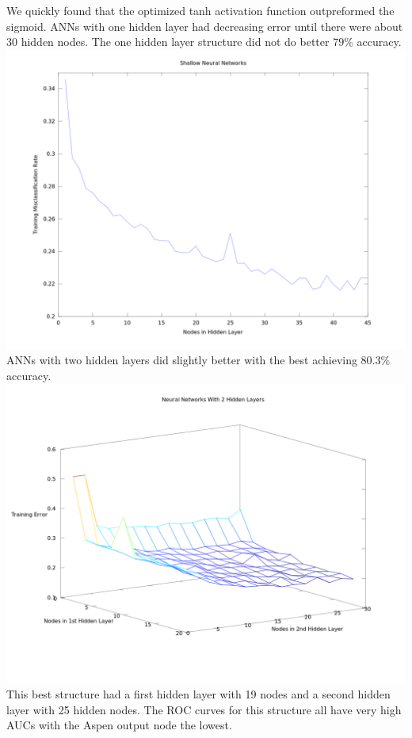 \documentclass[11pt]{article}
\begin{document}
We quickly found that the optimized tanh activation function outpreformed the sigmoid.  ANNs with one hidden layer had decreasing error until there were about 30 hidden nodes.  The one hidden layer structure did not do better $79\%$ accuracy. \\
\includegraphics[width=\linewidth]{images/shallow.png}
ANNs with two hidden layers did slightly better with the best achieving $80.3\%$ accuracy.\\
\includegraphics[width=\linewidth]{images/deep4.png}
This best structure had a first hidden layer with 19 nodes and a second hidden layer with 25 hidden nodes.  The ROC curves for this structure all have very high AUCs with the Aspen output node the lowest.\\
\end{document}
